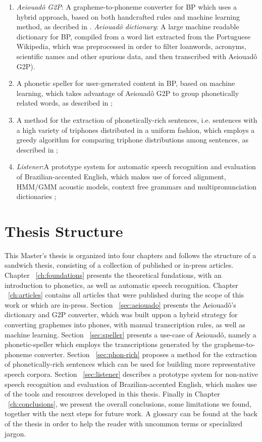 \begin{enumerate}
 \item \emph{Aeiouad\^o G2P}: A grapheme-to-phoneme converter for \ac{BP} which uses a hybrid approach, based on both handcrafted rules and machine learning method, as decribed in \citeauthor{Mendonca2014} \cite{Mendonca2014}. \emph{Aeiouad\^o dictionary}: A large machine readable dictionary for \ac{BP}, compiled from a word list extracted from the Portuguese Wikipedia, which was preprocessed in order to filter loanwords, acronyms, scientific names and other spurious data, and then transcribed with Aeiouad\^o G2P).
 \item A phonetic speller for user-generated content in \ac{BP}, based on machine learning, which takes advantage of Aeiouad\^o G2P to group phonetically related words, as described in \citeauthor{Mendonca2015} \cite{Mendonca2015}; 
 \item A method for the extraction of phonetically-rich sentences, i.e. sentences with a high variety of triphones distributed in a uniform fashion, which employs a greedy algorithm for comparing triphone distributions among sentences, as described in \citeauthor{Mendonca2014b} \cite{Mendonca2014b};
 \item \emph{Listener}:A prototype system for automatic speech recognition and evaluation of Brazilian-accented English, which makes use of forced alignment, \ac{HMM}/\ac{GMM} acoustic models, context free grammars and multipronunciation dictionaries \cite{Mendonca2016};
\end{enumerate}

\section*{Thesis Structure}

This Master's thesis is organized into four chapters and follows the structure of a sandwich thesis, consisting of a collection of published or in-press articles. Chapter ~\ref{ch:foundations} presents the theoretical fundations, with an introduction to phonetics, as well as automatic speech recognition. Chapter ~\ref{ch:articles} contains all articles that were published during the scope of this work or which are in-press. Section ~\ref{sec:aeiouado} presents the Aeiouad\^o's dictionary and \ac{G2P} converter, which was built uppon a hybrid strategy for converting graphemes into phones, with manual transcription rules, as well as machine learning. Section ~\ref{sec:speller} presents a use-case of Aeiouad\^o, namely a phonetic-speller which employs the transcriptions generated by the grapheme-to-phoneme converter. Section ~\ref{sec:phon-rich} proposes a method for the extraction of phonetically-rich sentences which can be used for building more representative speech corpora. Section ~\ref{sec:listener} describes a prototype system for non-native speech recognition and evaluation of Brazilian-accented English, which makes use of the tools and resources developed in this thesis. Finally in Chapter ~\ref{ch:conclusions}, we present the overall conclusions, some limitations we found, together with the next steps for future work. A glossary can be found at the back of the thesis in order to help the reader with uncommon terms or specialized jargon.
